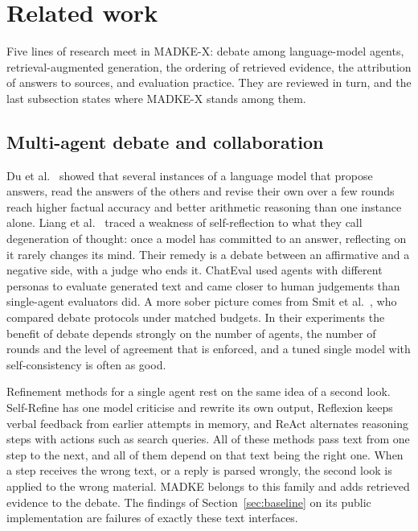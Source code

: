 \section{Related work}
\label{sec:related_work}

Five lines of research meet in MADKE-X: debate among language-model agents, retrieval-augmented generation, the ordering of retrieved evidence, the attribution of answers to sources, and evaluation practice. They are reviewed in turn, and the last subsection states where MADKE-X stands among them.

\subsection{Multi-agent debate and collaboration}
Du et al.~\cite{du2024debate} showed that several instances of a language model that propose answers, read the answers of the others and revise their own over a few rounds reach higher factual accuracy and better arithmetic reasoning than one instance alone. Liang et al.~\cite{liang2024divergent} traced a weakness of self-reflection to what they call degeneration of thought: once a model has committed to an answer, reflecting on it rarely changes its mind. Their remedy is a debate between an affirmative and a negative side, with a judge who ends it. ChatEval \cite{chan2024chateval} used agents with different personas to evaluate generated text and came closer to human judgements than single-agent evaluators did. A more sober picture comes from Smit et al.~\cite{smit2024mad}, who compared debate protocols under matched budgets. In their experiments the benefit of debate depends strongly on the number of agents, the number of rounds and the level of agreement that is enforced, and a tuned single model with self-consistency \cite{wang2023sc} is often as good.

Refinement methods for a single agent rest on the same idea of a second look. Self-Refine \cite{madaan2023selfrefine} has one model criticise and rewrite its own output, Reflexion \cite{shinn2023reflexion} keeps verbal feedback from earlier attempts in memory, and ReAct \cite{yao2023react} alternates reasoning steps with actions such as search queries. All of these methods pass text from one step to the next, and all of them depend on that text being the right one. When a step receives the wrong text, or a reply is parsed wrongly, the second look is applied to the wrong material. MADKE belongs to this family and adds retrieved evidence to the debate. The findings of Section~\ref{sec:baseline} on its public implementation are failures of exactly these text interfaces.

